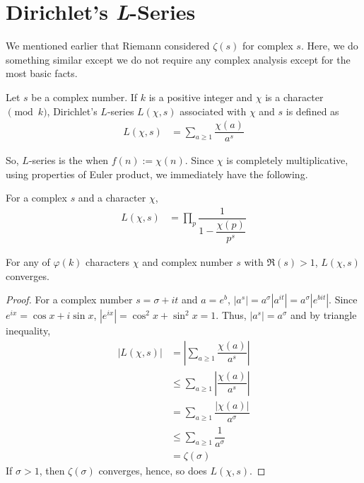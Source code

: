 \documentclass[elemannt.tex]{subfile}
\begin{document}
	\section{Dirichlet's \textit{L}-Series}
	We mentioned earlier that Riemann considered $\zeta(s)$ for complex $s$. Here, we do something similar except we do not require any complex analysis except for the most basic facts.
		\begin{definition}[$L$-Series]
			Let $s$ be a complex number. If $k$ is a positive integer and $\chi$ is a character $\pmod{k}$, Dirichlet's $L$-series $L(\chi,s)$ associated with $\chi$ and $s$ is defined as
				\begin{align*}
					L(\chi, s)
						& = \sum_{a\geq 1}\dfrac{\chi(a)}{a^{s}}
				\end{align*}
		\end{definition}
	So, $L$-series is the  when $f(n):=\chi(n)$. Since $\chi$ is completely multiplicative, using properties of Euler product, we immediately have the following.
		\begin{proposition}
			For a complex $s$ and a character $\chi$,
				\begin{align*}
					L(\chi, s)
						& = \prod_{p}\dfrac{1}{1-\dfrac{\chi(p)}{p^{s}}}
				\end{align*}
		\end{proposition}

		\begin{proposition}
			For any of $\varphi(k)$ characters $\chi$ and complex number $s$ with $\mathfrak{R}(s)>1$, $L(\chi, s)$ converges.
		\end{proposition}

		\begin{proof}
			For a complex number $s=\sigma+it$ and $a=e^{b}$, $|a^{s}|=a^{\sigma}|a^{it}|=a^{\sigma}|e^{bit}|$. Since $e^{ix}=\cos{x}+i\sin{x}$, $|e^{ix}|=\cos^{2}{x}+\sin^{2}{x}=1$. Thus, $|a^{s}|=a^{\sigma}$ and by triangle inequality,
				\begin{align*}
					|L(\chi,s)|
						& = \left|\sum_{a\geq 1}\dfrac{\chi(a)}{a^{s}}\right|\\
						& \leq \sum_{a\geq 1}\left|\dfrac{\chi(a)}{a^{s}}\right|\\
						& = \sum_{a\geq 1}\dfrac{|\chi(a)|}{a^{\sigma}}\\
						& \leq \sum_{a\geq 1}\dfrac{1}{a^{\sigma}}\\
						& = \zeta(\sigma)
				\end{align*}
			If $\sigma > 1$, then $\zeta(\sigma)$ converges, hence, so does $L(\chi, s)$.
		\end{proof}
\end{document}
